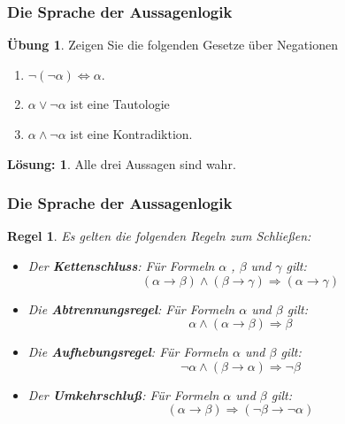 \documentclass[hyperref={pdfpagelabels=false}]{beamer}
\theoremstyle{plain}%
\newtheorem*{regel}{Regel}
\theoremstyle{definition}
\newtheorem*{uebung}{Übung}
\newtheorem*{sol}{Lösung:}
\theoremstyle{remark}
\begin{document}
\begin{frame}
\frametitle{Die Sprache der Aussagenlogik}

\begin{uebung}
Zeigen Sie die folgenden Gesetze über Negationen

\begin{enumerate}
\item $\neg ( \neg \alpha) \iff \alpha$.
\item $\alpha \vee \neg \alpha$ ist eine Tautologie
\item $\alpha \wedge \neg \alpha $ ist eine Kontradiktion.
\end{enumerate}

\end{uebung}

\bigbreak

\bigbreak

\pause \pause 

\begin{sol}
Alle drei Aussagen sind wahr. 
\end{sol}

\end{frame}

\begin{frame}
\frametitle{Die Sprache der Aussagenlogik}

\begin{regel}
Es gelten die folgenden Regeln zum Schließen:
\begin{itemize}
\item<2-> Der \textbf{Kettenschluss}: Für Formeln $\alpha$ , $\beta$ und $\gamma$ gilt: 
  	$$ ( \alpha \rightarrow \beta) \wedge ( \beta \rightarrow \gamma) \Longrightarrow ( \alpha \rightarrow \gamma) $$
\item<3-> Die \textbf{Abtrennungsregel}: Für Formeln $\alpha$ und $\beta$ gilt: 
  	$$ \alpha \wedge ( \alpha \rightarrow \beta) \Longrightarrow \beta $$
\item<4-> Die \textbf{Aufhebungsregel}:  Für Formeln $\alpha$ und $\beta$ gilt: 
  	$$ \neg \alpha \wedge ( \beta \longrightarrow \alpha) \Longrightarrow \neg \beta $$
\item<5-> Der \textbf{Umkehrschluß}:  Für Formeln $\alpha$ und $\beta$ gilt: 
  	$$ (\alpha \longrightarrow \beta) \Longrightarrow ( \neg \beta \longrightarrow \neg \alpha ) $$
\end{itemize}
\end{regel}

\end{frame}
\end{document}
